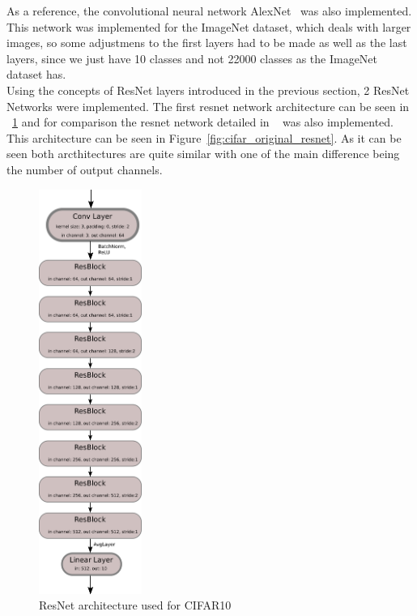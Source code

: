 \documentclass[english,preprint,JIP]{ipsj}
\begin{document}
As a reference, the convolutional neural network AlexNet~\cite{alexnet} was also
implemented. This network was implemented for the ImageNet dataset, which deals
with larger images, so some adjustmens to the first layers had to be made as
well as the last layers, since we just have 10 classes and not 22000 classes as
the ImageNet dataset has.\\

Using the concepts of ResNet layers introduced in the previous section, 2 ResNet
Networks were implemented. The first resnet network architecture can be seen in
~\ref{fig:cifar_resnet} and for comparison the resnet network detailed in
~\cite{resnet} was also implemented. This architecture can be seen in
Figure~\ref{fig:cifar_original_resnet}. As it can be seen both arcthitectures
are quite similar with one of the main difference being the number of output
channels.\\

\begin{figure}
    \centering
    \includegraphics[width=0.3\textwidth]{img/cifar_resnet.png}
    \caption{ResNet architecture used for CIFAR10}
    \label{fig:cifar_resnet}
\end{figure}
\end{document}
